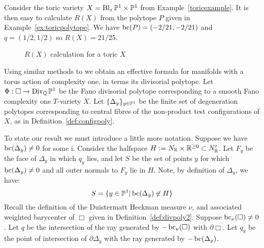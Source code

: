 \begin{example}
Consider the toric variety \(X = \operatorname{Bl}_z \mathbb{P}^1 \times \mathbb{P}^1\) from Example~\ref{toricexample}. It is then easy to calculate \(R(X)\) from the polytope \(P\) given in Example~\ref{ex:toricpolytope}. We have \(\mathop{\rm bc}\nolimits(P) = (-2/21,-2/21)\) and \(q = (1/2,1/2)\) so \(R(X) = 21/25\).
\begin{figure}[h]
\centering
	\caption{$R(X)$ calculation for a toric $X$}
\end{figure}
\end{example}

Using similar methods to \cite{datar2016kahler} we obtain an effective formula for manifolds with a torus action of complexity one, in terms its divisorial polytope. Let \(\Phi: \Box \to \operatorname{Div}_{\mathbb{Q}} \mathbb{P}^1\) be the Fano divisorial polytope corresponding to a smooth Fano complexity one \(T\)-variety \(X\). Let \(\{\Delta_y\}_{y \in \mathbb{P}^1}\) be the finite set of degeneration polytopes corresponding to central fibres of the non-product test configurations of \(X\), as in Definition~\ref{def:configpoly}.

To state our result we must introduce a little more notation. Suppose we have \(\mathop{\rm bc}\nolimits(\Delta_y) \neq 0\) for some i. Consider the halfspace \(H := N_{\mathbb{R}} \times \mathbb{R}^{\ge 0} \subset N'_{\mathbb{R}}\). Let \(F_y\) be  the face of \(\Delta_y\) in which \(q_y\) lies, and let \(S\) be the set of points \(y\) for which \(\mathop{\rm bc}\nolimits(\Delta_y) \neq 0\) and all outer normals to \(F_y\) lie in \(H\). Note, by definition of \(\Delta_y\), we have:
\[
S = \{ y \in \mathbb{P}^1 | \mathop{\rm bc}\nolimits(\Delta_y) \not\in H \}
\]
Recall the definition of the Duistermatt Heckman measure \(\nu\), and associated weighted barycenter of \(\Box\) given in Definition~\ref{def:divpoly2}. Suppose \(\mathop{\rm bc}\nolimits_\nu(\Box) \neq 0\). Let \(q\) be the intersection of the ray generated by \(-\mathop{\rm bc}\nolimits_\nu(\Box)\) with \(\partial \Box\). Let \(q_y\) be the point of intersection of \(\partial \Delta_y\) with the ray generated by \(-\mathop{\rm bc}\nolimits(\Delta_y)\).

